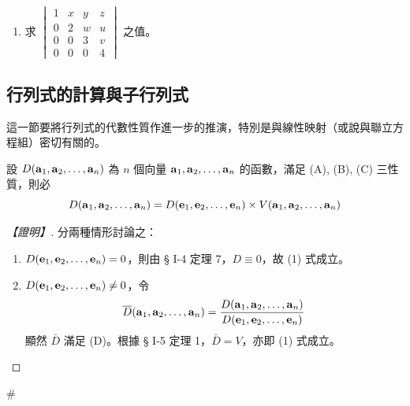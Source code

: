 \begin{enumerate}[label=\arabic*., leftmargin=2em]
\begin{center}
  \end{center}
  在四階以上有無類似結果？試以下式為例計算一下：
  \[ \begin{vmatrix}
  1 & 1 & 0 & 1 \\
  -1 & 1 & 1 & 0 \\
  0 & 1 & 0 & -1 \\
  2 & -1 & 1 & -1
  \end{vmatrix} \]

  \item 求 $\begin{vmatrix}
  1 & x & y & z \\
  0 & 2 & w & u \\
  0 & 0 & 3 & v \\
  0 & 0 & 0 & 4
  \end{vmatrix}$ 之值。
\end{enumerate}

\subsection{行列式的計算與子行列式}\label{sec:b6s-1-6}
\resetsectcounters

這一節要將行列式的代數性質作進一步的推演，特別是與線性映射（或說與聯立方程組）密切有關的。

\begin{theorem}\label{thm:b6s-1-12}
設 $D(\boldsymbol{\mathbf{a}}_1, \boldsymbol{\mathbf{a}}_2, \dots, \boldsymbol{\mathbf{a}}_n)$ 為 $n$ 個向量 $\boldsymbol{\mathbf{a}}_1, \boldsymbol{\mathbf{a}}_2, \dots, \boldsymbol{\mathbf{a}}_n$ 的函數，滿足 (A), (B), (C) 三性質，則必
\begin{equation}
D(\boldsymbol{\mathbf{a}}_1, \boldsymbol{\mathbf{a}}_2, \dots, \boldsymbol{\mathbf{a}}_n) = D(\boldsymbol{\mathbf{e}}_1, \boldsymbol{\mathbf{e}}_2, \dots, \boldsymbol{\mathbf{e}}_n) \times V(\boldsymbol{\mathbf{a}}_1, \boldsymbol{\mathbf{a}}_2, \dots, \boldsymbol{\mathbf{a}}_n) \label{eq:b6s-1-6-1}
\end{equation}
\end{theorem}

\begin{proof}[【證明】]
分兩種情形討論之：
\begin{enumerate}[label=(\roman*), leftmargin=2em]
  \item $D(\boldsymbol{\mathbf{e}}_1, \boldsymbol{\mathbf{e}}_2, \dots, \boldsymbol{\mathbf{e}}_n) = 0$，則由 § I-4 定理 7，$D \equiv 0$，故 (1) 式成立。
  \item $D(\boldsymbol{\mathbf{e}}_1, \boldsymbol{\mathbf{e}}_2, \dots, \boldsymbol{\mathbf{e}}_n) \ne 0$，令
  \[ \overline{D}(\boldsymbol{\mathbf{a}}_1, \boldsymbol{\mathbf{a}}_2, \dots, \boldsymbol{\mathbf{a}}_n) = \dfrac{D(\boldsymbol{\mathbf{a}}_1, \boldsymbol{\mathbf{a}}_2, \dots, \boldsymbol{\mathbf{a}}_n)}{D(\boldsymbol{\mathbf{e}}_1, \boldsymbol{\mathbf{e}}_2, \dots, \boldsymbol{\mathbf{e}}_n)} \]
  顯然 $\bar{D}$ 滿足 (D)。根據 § I-5 定理 1，$\bar{D} = V$，亦即 (1) 式成立。
\end{enumerate}
\end{proof}\hfill$\#$


